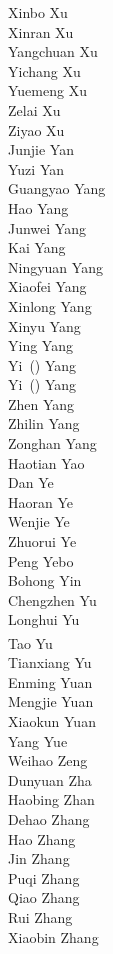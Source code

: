 Xinbo Xu\\
Xinran Xu\\
Yangchuan Xu\\
Yichang Xu\\
Yuemeng Xu\\
Zelai Xu\\
Ziyao Xu\\
Junjie Yan\\
Yuzi Yan\\
Guangyao Yang\\
Hao Yang\\
Junwei Yang\\
Kai Yang\\
Ningyuan Yang\\
Xiaofei Yang\\
Xinlong Yang\\
Xinyu Yang\\
Ying Yang\\
Yi~() Yang\\
Yi~() Yang\\
Zhen Yang\\
Zhilin Yang\\
Zonghan Yang\\
Haotian Yao\\
Dan Ye\\
Haoran Ye\\
Wenjie Ye\\
Zhuorui Ye\\
Peng Yebo\\
Bohong Yin\\
Chengzhen Yu\\
Longhui Yu\\
Tao Yu\textsuperscript{\textdagger}\\
Tianxiang Yu\\
Enming Yuan\\
Mengjie Yuan\\
Xiaokun Yuan\\
Yang Yue\\
Weihao Zeng\\
Dunyuan Zha\\
Haobing Zhan\\
Dehao Zhang\\
Hao Zhang\\
Jin Zhang\\
Puqi Zhang\\
Qiao Zhang\\
Rui Zhang\\
Xiaobin Zhang\\
